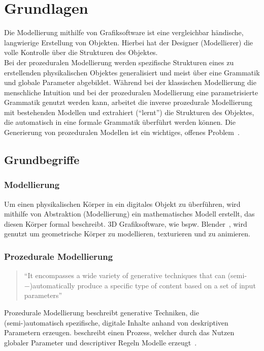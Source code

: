 
\chapter{Grundlagen}

Die Modellierung mithilfe von Grafiksoftware ist eine vergleichbar händische, langwierige Erstellung von
Objekten.
Hierbei hat der Designer (Modellierer) die volle Kontrolle über die Strukturen des Objektes.\\
Bei der prozeduralen Modellierung werden spezifische Strukturen eines zu erstellenden physikalischen Objektes
generalisiert und meist über eine Grammatik und globale Parameter abgebildet.
Während bei der klassischen Modellierung die menschliche Intuition und bei der prozeduralen Modellierung eine
parametrisierte Grammatik genutzt werden kann, arbeitet die inverse prozedurale Modellierung mit bestehenden Modellen und
extrahiert ("`lernt"') die Strukturen des Objektes, die automatisch in eine formale Grammatik überführt werden können.
Die Generierung von prozeduralen Modellen ist ein wichtiges, offenes Problem~\cite{benes_2011}.

\section{Grundbegriffe}

\subsection*{Modellierung}
Um einen physikalischen Körper in ein digitales Objekt zu überführen, wird mithilfe von Abstraktion (Modellierung)
ein mathematisches Modell erstellt, das diesen Körper formal beschreibt.
3D Grafiksoftware, wie bspw. Blender~\cite{blender}, wird genutzt um geometrische Körper zu modellieren, texturieren
und zu animieren.

\newpage

\subsection*{Prozedurale Modellierung}
\begin{quote}
    "`It encompasses a wide variety of generative techniques that
    can (semi-−)automatically produce a specific type of content based on a set of input
    parameters"'~\cite{smelik_2014}
\end{quote}
Prozedurale Modellierung beschreibt generative Techniken, die \\(semi-)automatisch spezifische, digitale
Inhalte anhand von deskriptiven Parametern erzeugen.
\citeauthor{smelik_2014} beschreibt einen Prozess, welcher durch das Nutzen globaler Parameter und descriptiver Regeln
Modelle erzeugt~\cite{smelik_2014}.

